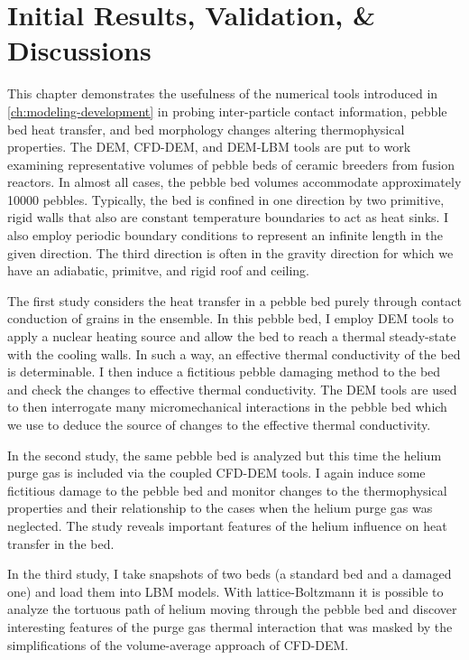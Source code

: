 \chapter{Initial Results, Validation, \& Discussions}\label{sec:dem-studies}

This chapter demonstrates the usefulness of the numerical tools introduced in \cref{ch:modeling-development} in probing inter-particle contact information, pebble bed heat transfer, and bed morphology changes altering thermophysical properties. The DEM, CFD-DEM, and DEM-LBM tools are put to work examining representative volumes of pebble beds of ceramic breeders from fusion reactors. In almost all cases, the pebble bed volumes accommodate approximately \num{10000} pebbles. Typically, the bed is confined in one direction by two primitive, rigid walls that also are constant temperature boundaries to act as heat sinks. I also employ periodic boundary conditions to represent an infinite length in the given direction. The third direction is often in the gravity direction for which we have an adiabatic, primitve, and rigid roof and ceiling.

The first study considers the heat transfer in a pebble bed purely through contact conduction of grains in the ensemble. In this pebble bed, I employ DEM tools to apply a nuclear heating source and allow the bed to reach a thermal steady-state with the cooling walls. In such a way, an effective thermal conductivity of the bed is determinable. I then induce a fictitious pebble damaging method to the bed and check the changes to effective thermal conductivity. The DEM tools are used to then interrogate many micromechanical interactions in the pebble bed which we use to deduce the source of changes to the effective thermal conductivity.

In the second study, the same pebble bed is analyzed but this time the helium purge gas is included via the coupled CFD-DEM tools. I again induce some fictitious damage to the pebble bed and monitor changes to the thermophysical properties and their relationship to the cases when the helium purge gas was neglected. The study reveals important features of the helium influence on heat transfer in the bed.

In the third study, I take snapshots of two beds (a standard bed and a damaged one) and load them into LBM models. With lattice-Boltzmann it is possible to analyze the tortuous path of helium moving through the pebble bed and discover interesting features of the purge gas thermal interaction that was masked by the simplifications of the volume-average approach of CFD-DEM.



